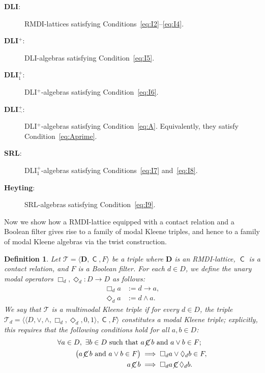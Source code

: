 \documentclass[10pt,a4paper]{amsart}
\newtheorem{definition}[theorem]{Definition}
\DeclareMathOperator{\con}{\mathsf{C}}
\DeclareMathOperator{\notcon}{\cancel{ \con}}
\newcommand{\D}{\mathbf{D}}
\begin{document}
\begin{description}
\item[\textbf{DLI}:] RMDI-lattices satisfying
Conditions~\eqref{eq:I2}--\eqref{eq:I4}.

\item[\textbf{DLI$^{+}$}:] DLI-algebras satisfying
Condition~\eqref{eq:I5}.

\item[\textbf{DLI$^{+}_{1}$}:] DLI$^{+}$-algebras satisfying
Condition~\eqref{eq:I6}.

\item[\textbf{DLI$^{+}_{\neg}$}:] DLI$^{+}$-algebras satisfying
Condition~\eqref{eq:A}. Equivalently, they satisfy
Condition~\eqref{eq:Aprime}.

\item[\textbf{SRL}:] DLI$^{+}_{1}$-algebras satisfying
Conditions~\eqref{eq:I7} and~\eqref{eq:I8}.

\item[\textbf{Heyting}:] SRL-algebras satisfying
Condition~\eqref{eq:I9}.
\end{description}

Now we show how a RMDI-lattice equipped with a contact relation and a Boolean filter gives rise to a family of modal Kleene triples, and hence to a family of modal Kleene algebras via the twist construction.

\begin{definition}
Let $\mathcal{T}=\langle \D, \con, F\rangle$ be a triple where $\D$ is an RMDI-lattice, $\con$ is a contact relation, and $F$ is a Boolean filter. For each $d \in D$, we define the unary modal operators $\Box_d, \Diamond_d: D \to D$ as follows:
\begin{align*}
    \Box_d a &:= d \to a, \\
    \Diamond_d a &:= d \wedge a.
\end{align*}
We say that $\mathcal{T}$ is a \emph{multimodal Kleene triple} if for every $d \in D$, the triple $\mathcal{T}_d=\langle\langle D,\vee,\wedge, \Box_d, \Diamond_d,0,1\rangle, \con, F\rangle$ constitutes a modal Kleene triple; explicitly, this requires that the following conditions hold for all $a, b\in D$:
\begin{align}
\forall a \in D,\ \exists b \in D \text{ such that }& a\notcon b \text{ and } a \vee b \in F;\\
    \big(a\notcon b \text{ and } a \vee b \in F\big) &\implies \Box_d a \vee \Diamond_d b \in F, \label{cond:filter2} \\
    a\notcon b &\implies \Box_d a \notcon \Diamond_d b. \label{ax:modal-contact2}
\end{align}
\end{definition}
\end{document}
